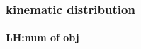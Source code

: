 \documentclass[usenames,dvipsnames]{beamer}
\begin{document}
\begin{frame}
\frametitle{kinematic distribution}
\framesubtitle{LH:num of obj}
%     


\end{frame}
\end{document}
